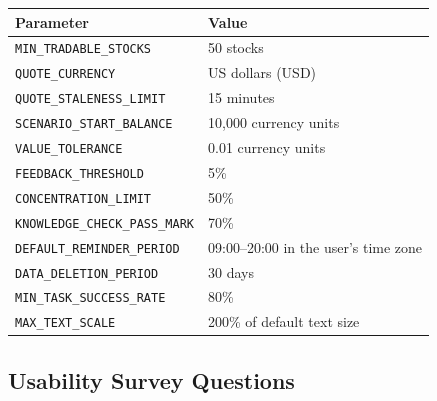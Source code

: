 \documentclass[12pt, titlepage]{article}
\begin{document}
\begin{center}
\begin{tabular}{p{} p{}}
\hline
\textbf{Parameter} & \textbf{Value} \\
\hline

\texttt{MIN\_TRADABLE\_STOCKS} & 50 stocks \\[6pt]

\texttt{QUOTE\_CURRENCY} & US dollars (USD) \\[6pt]

\texttt{QUOTE\_STALENESS\_LIMIT} & 15 minutes \\[6pt]

\texttt{SCENARIO\_START\_BALANCE} & 10,000 currency units \\[6pt]

\texttt{VALUE\_TOLERANCE} & 0.01 currency units \\[6pt]

\texttt{FEEDBACK\_THRESHOLD} & 5\% \\[6pt]

\texttt{CONCENTRATION\_LIMIT} & 50\% \\[6pt]

\texttt{KNOWLEDGE\_CHECK\_\allowbreak PASS\_MARK} & 70\% \\[6pt]

\texttt{DEFAULT\_REMINDER\_\allowbreak PERIOD} &
09:00--20:00 in the user's time zone \\[6pt]

\texttt{DATA\_DELETION\_PERIOD} & 30 days \\[6pt]

\texttt{MIN\_TASK\_SUCCESS\_RATE} & 80\% \\[6pt]

\texttt{MAX\_TEXT\_SCALE} & 200\% of default text size \\

\hline
\end{tabular}
\end{center}

\subsection{Usability Survey Questions} \label{SecUsabilitySurvey}

\end{document}
